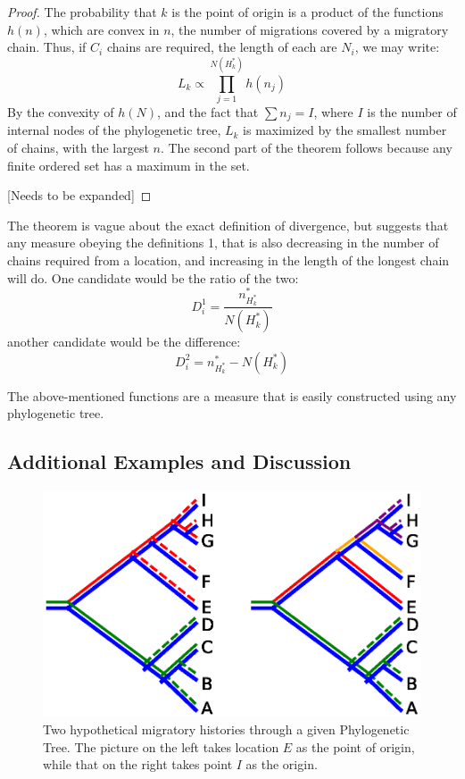 \documentclass[11pt]{article}
\begin{document}
{\begin{proof}
The probability that $k$ is the point of origin is a product of the functions $h(n)$, which are convex in $n$,  the number of migrations covered by a migratory chain. Thus, if $C_i$ chains are required, the length of each are $N_i$, we may write:
\begin{equation*}
L_k \propto\prod_{j=1}^{N(H^*_k)} h(n_j)
\end{equation*} 
By the convexity of $h(N)$, and the fact that $\sum n_j=I$, where $I$ is the number of internal nodes of the phylogenetic tree, $L_k$ is maximized by the smallest number of chains, with the largest $n$. The second part of the theorem follows because any finite ordered set has a maximum in the set.

[Needs to be expanded]
  
\end{proof} 

The theorem is vague about the exact definition of divergence, but suggests that any measure obeying the definitions 1, that is also decreasing in the number of chains required from a location, and increasing in the length of the longest chain will do. One candidate would be the ratio of the two:
\begin{equation*}
D^1_i=\frac{n^*_{H^*_k}}{N(H^*_k)}
\end{equation*}
another candidate would be the difference:
\begin{equation*}
D^2_i=n^*_{H^*_k}-N(H^*_k)
\end{equation*}



The above-mentioned functions  are a measure that is easily constructed using any phylogenetic tree.  

\subsection{Additional Examples and Discussion}

 
\begin{figure}
\begin{center}
\includegraphics[width=\textwidth]{AncillaryFiles//example1.eps}
\caption{Two hypothetical migratory histories through a given Phylogenetic Tree. The picture on the left takes location $E$ as the point of origin, while that on the right takes point $I$ as the origin. } \label{ex1}
\end{center} 
\end{figure}

}
\end{document}
